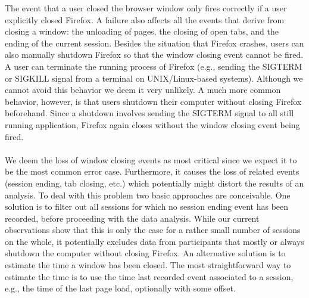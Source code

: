 \documentclass[11pt,fleqn,twoside]{article}
\begin{document}
The event that a user closed the browser window only fires correctly if a user explicitly closed Firefox. A failure also affects all the events that derive from closing a window: the unloading of pages, the closing of open tabs, and the ending of the current session. Besides the situation that Firefox crashes, users can also manually shutdown Firefox so that the window closing event cannot be fired. A user can terminate the running process of Firefox (e.g., sending the SIGTERM or SIGKILL signal from a terminal on UNIX/Linux-based systems). Although we cannot avoid this behavior we deem it very unlikely. A much more common behavior, however, is that users shutdown their computer without closing Firefox beforehand. Since a shutdown involves sending the SIGTERM signal to all still running application, Firefox again closes without the window closing event being fired.
\\
\\
We deem the loss of window closing events as most critical since we expect it to be the most common error case. Furthermore, it causes the loss of related events (session ending, tab closing, etc.) which potentially might distort the results of an analysis. To deal with this problem two basic approaches are conceivable. One solution is to filter out all sessions for which no session ending event has been recorded, before proceeding with the data analysis. While our current observations show that this is only the case for a rather small number of sessions on the whole, it potentially excludes data from participants that mostly or always shutdown the computer without closing Firefox. An alternative solution is to estimate the time a window has been closed. The most straightforward way to estimate the time is to use the time last recorded event associated to a session, e.g., the time of the last page load, optionally with some offset. 
\end{document}
